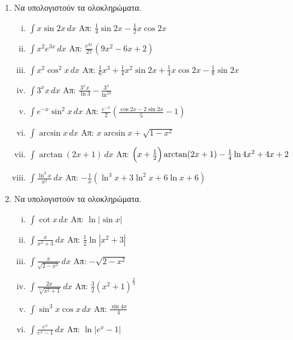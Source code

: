 \begin{enumerate}
  \item Να υπολογιστούν τα ολοκληρώματα.
    \begin{enumerate}[i)]
      \item $\int x\sin2x \, dx$ \hfill Απ: $\frac{1}{4}\sin2x-\frac{1}{2}x\cos2x$
      \item $\int x^2e^{3x} \, dx$ \hfill Απ: $\frac{e^{3x}}{27}(9x^2-6x+2)$
      \item $\int x^2\cos^2x \, dx$ 
        \hfill Απ: $\frac{1}{6}x^3 + \frac{1}{4}x^2\sin2x+\frac{1}{4}x\cos2x-\frac{1}{8}
        \sin2x$
      \item $\int 3^{x}x \, dx$ \hfill Απ: $\frac{3^xx}{\ln3}-\frac{3^x}{\ln^23}$
      \item $\int e^{-x}\sin^2x \, dx$ 
        \hfill Απ: $\frac{e^{-x}}{2}\left(\frac{\cos2x-2\sin2x}{5}-1\right)$
      \item $\int \arcsin x \, dx$ \hfill Απ: $x\arcsin x + \sqrt{1-x^2}$
      \item $ \int \arctan(2x+1) \,{dx} $ 
        \hfill Απ: $ \Bigl(x+ \frac{1}{2}\Bigr) \arctan(2x+1)-\frac{1}{4} 
        \ln{4x^{2} + 4x +2} $
      \item $\int \frac{\ln^3x}{x^2} \, dx$ 
        \hfill Απ: $-\frac{1}{x}(\ln^3x+3\ln^2x+6\ln x+6)$
    \end{enumerate}

  \item Να υπολογιστούν τα ολοκληρώματα.
    \begin{enumerate}[i)]
      \item $\int \cot x \, dx$ \hfill Απ: $\ln|\sin x|$
      \item $\int\frac{x}{x^2+3} \, dx$ \hfill Απ: $\frac{1}{2}\ln|x^2+3|$
      \item $\int\frac{x}{\sqrt{2-x^{2}}} \, dx$ \hfill Απ: $ -\sqrt{2-x^{2}} $
      \item $ \int \frac{2x}{\sqrt[3]{x^{2}+1}} \,{dx} $ 
        \hfill Απ: $ \frac{3}{2} (x^{2}+1)^{\frac{2}{3}} $ 
      \item $\int \sin^3x\cos x \, dx$ \hfill Απ: $\frac{\sin4x}{4}$
      \item $\int \frac{e^x}{e^x-1} \, dx$ \hfill Απ: $\ln|e^x-1|$
    \end{enumerate}
\end{enumerate}





